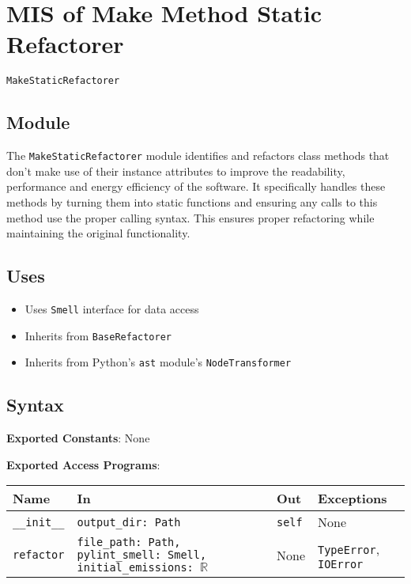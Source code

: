 \documentclass[12pt, titlepage]{article}
\begin{document}
\newpage

\section{MIS of Make Method Static Refactorer} \label{mis:MakeStatic}

\texttt{MakeStaticRefactorer}

\subsection{Module}

The \texttt{MakeStaticRefactorer} module identifies and refactors 
class methods that don't make use of their instance attributes to improve the readability, performance and energy efficiency of the software. It specifically handles these methods by turning them into static functions and ensuring any calls to this method use the proper calling syntax. This ensures proper refactoring while maintaining the original functionality.

\subsection{Uses}
\begin{itemize}
  \item Uses \texttt{Smell} interface for data access
  \item Inherits from \texttt{BaseRefactorer}
  \item Inherits from Python's \texttt{ast} module's \texttt{NodeTransformer}
\end{itemize}
  
\subsection{Syntax}
\noindent
\textbf{Exported Constants}: None

\noindent
\textbf{Exported Access Programs}:
  
\begin{tabularx}{\linewidth}{|l|>{\raggedright\arraybackslash}X|l|l|}
  \hline
  \textbf{Name} & \textbf{In} & \textbf{Out} & \textbf{Exceptions} \\
  \hline
  \texttt{\_\_init\_\_} & \texttt{output\_dir: Path} & \texttt{self} & None \\
  \hline
  \texttt{refactor} & \texttt{file\_path: Path, pylint\_smell: Smell, initial\_emissions: $\mathbb{R}$} & None & \texttt{TypeError}, \texttt{IOError} \\
  \hline
\end{tabularx}
  
\end{document}
